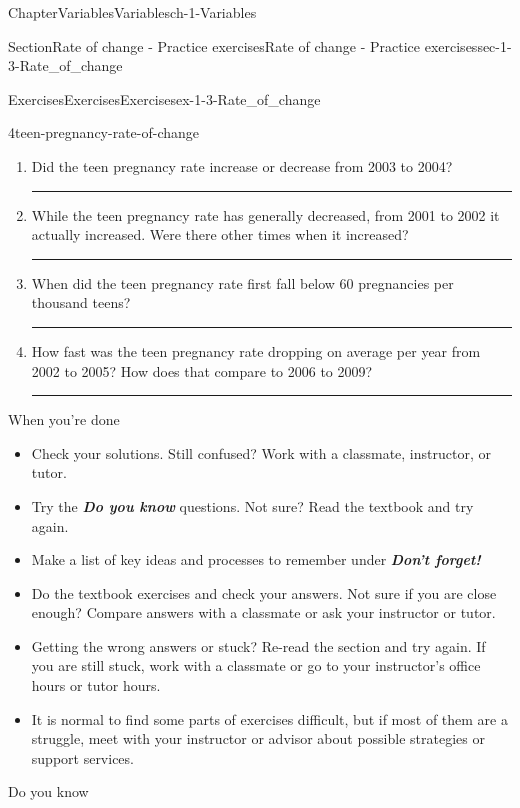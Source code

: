 \documentclass[twoside,11pt,]{book}
\newcommand{\alert}[1]{\textbf{\textit{#1}}}
\newlength{\workspacestrutwidth}
\numberwithin{equation}{section}
\begin{document}
\begin{chapterptx}{Chapter}{Variables}{}{Variables}{}{}{ch-1-Variables}
\begin{sectionptx}{Section}{Rate of change - Practice exercises}{}{Rate of change - Practice exercises}{}{}{sec-1-3-Rate_of_change}
\begin{exercises-subsection-numberless}{Exercises}{Exercises}{}{Exercises}{}{}{ex-1-3-Rate_of_change}
\begin{divisionexercise}{4}{}{}{teen-pregnancy-rate-of-change}
\begin{enumerate}[label=(\alph*),ref=\alph*]
\item{}Did the teen pregnancy rate increase or decrease from 2003 to 2004?%
\par\rule{\workspacestrutwidth}{0.45in}%
\item{}While the teen pregnancy rate has generally decreased, from 2001 to 2002 it actually increased. Were there other times when it increased?%
\par\rule{\workspacestrutwidth}{0.45in}%
\item{}When did the teen pregnancy rate first fall below 60 pregnancies per thousand teens?%
\par\rule{\workspacestrutwidth}{0.45in}%
\item{}How fast was the teen pregnancy rate dropping on average per year from 2002 to 2005? How does that compare to 2006 to 2009?%
\par\rule{\workspacestrutwidth}{0.45in}%
\end{enumerate}%
\end{divisionexercise}%
\end{exercises-subsection-numberless}
\begin{conclusion}{When you're done \textellipsis{}}%
%
\begin{itemize}[label=\textbullet]
\item{}Check your solutions. Still confused? Work with a classmate, instructor, or tutor.%
\item{}Try the \alert{Do you know} questions. Not sure? Read the textbook and try again.%
\item{}Make a list of key ideas and processes to remember under \alert{Don't forget!}%
\item{}Do the textbook exercises and check your answers. Not sure if you are close enough? Compare answers with a classmate or ask your instructor or tutor.%
\item{}Getting the wrong answers or stuck? Re-read the section and try again. If you are still stuck, work with a classmate or go to your instructor's office hours or tutor hours.%
\item{}It is normal to find some parts of exercises difficult, but if most of them are a struggle, meet with your instructor or advisor about possible strategies or support services.%
\end{itemize}
%
\end{conclusion}%
\begin{conclusion}{Do you know \textellipsis{}}%
%
\begin{enumerate}[label={\Alph*.}]

\end{enumerate}
\end{conclusion}
\end{sectionptx}
\end{chapterptx}
\end{document}
